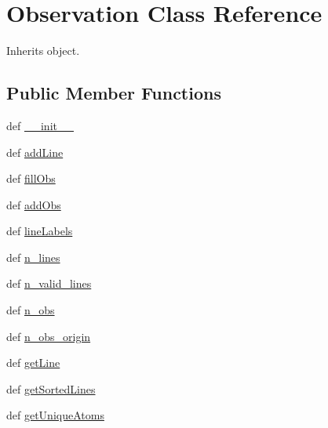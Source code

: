 \hypertarget{classpyneb_1_1core_1_1pynebcore_1_1_observation}{\section{Observation Class Reference}
\label{classpyneb_1_1core_1_1pynebcore_1_1_observation}
}


Inherits object.

\subsection*{Public Member Functions}
\begin{DoxyCompactItemize}
\item 
def \hyperlink{classpyneb_1_1core_1_1pynebcore_1_1_observation_ac775ee34451fdfa742b318538164070e}{\-\_\-\-\_\-init\-\_\-\-\_\-}
\item 
def \hyperlink{classpyneb_1_1core_1_1pynebcore_1_1_observation_ae990bfc62b58d6e39cfe005eb241529c}{add\-Line}
\item 
def \hyperlink{classpyneb_1_1core_1_1pynebcore_1_1_observation_a4022c20cf3949b26f8941e4591ea1f68}{fill\-Obs}
\item 
def \hyperlink{classpyneb_1_1core_1_1pynebcore_1_1_observation_ada122b7940c9876783a28ae85efb978b}{add\-Obs}
\item 
def \hyperlink{classpyneb_1_1core_1_1pynebcore_1_1_observation_a35dec051788a9f09b4d734f94fa20bf9}{line\-Labels}
\item 
def \hyperlink{classpyneb_1_1core_1_1pynebcore_1_1_observation_a590a6c6471f605b101f13bb229d0cbc1}{n\-\_\-lines}
\item 
def \hyperlink{classpyneb_1_1core_1_1pynebcore_1_1_observation_a58051db710c58b61251cd5652137c59a}{n\-\_\-valid\-\_\-lines}
\item 
def \hyperlink{classpyneb_1_1core_1_1pynebcore_1_1_observation_a7845706e79bbc79af480b1bf772dc1a0}{n\-\_\-obs}
\item 
def \hyperlink{classpyneb_1_1core_1_1pynebcore_1_1_observation_aa09beeb05721cfe0be928ae1c4af60ed}{n\-\_\-obs\-\_\-origin}
\item 
def \hyperlink{classpyneb_1_1core_1_1pynebcore_1_1_observation_a22f7664b820991e5f16a0e95facb117d}{get\-Line}
\item 
def \hyperlink{classpyneb_1_1core_1_1pynebcore_1_1_observation_aed6ad0861782470233b395c81ad2e24a}{get\-Sorted\-Lines}
\item 
def \hyperlink{classpyneb_1_1core_1_1pynebcore_1_1_observation_a535c190615ab1b9014311e43014a929c}{get\-Unique\-Atoms}

\end{DoxyCompactItemize}
